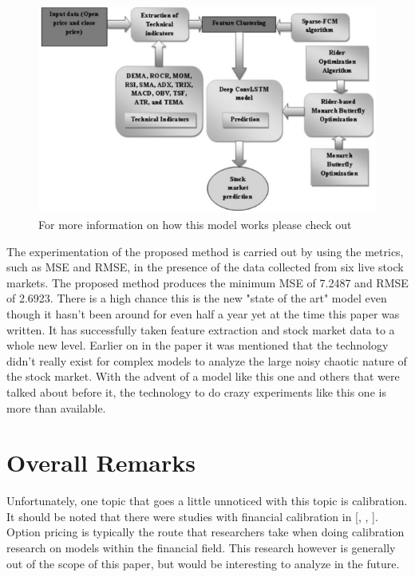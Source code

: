 \documentclass{article}
\theoremstyle{plain}
\theoremstyle{definition}
\numberwithin{equation}{section}
\numberwithin{theorem}{section}
\numberwithin{lemma}{section}
\numberwithin{definition}{section}
\numberwithin{proposition}{section}
\numberwithin{corollary}{section}
\begin{document}
	 \begin{figure}[h]
		\includegraphics[width=\linewidth]{butterfly}
		\caption{For more information on how this model works please check out \cite{Kelotra2020}}
	 \end{figure}
	 
	 
	 The experimentation of the proposed method is carried out by using the metrics, such as MSE and RMSE, in the presence of the data collected from six live stock markets. The proposed method produces the minimum MSE of 7.2487 and RMSE of 2.6923. There is a high chance this is the new "state of the art" model even though it hasn't been around for even half a year yet at the time this paper was written. It has successfully taken feature extraction and stock market data to a whole new level. Earlier on in the paper it was mentioned that the technology didn't really exist for complex models to analyze the large noisy chaotic nature of the stock market. With the advent of a model like this one and others that were talked about before it, the technology to do crazy experiments like this one is more than available.    
	 
	\section{Overall Remarks}
	Unfortunately, one topic that goes a little unnoticed with this topic is calibration. It should be noted that there were studies with financial calibration in [\cite{Itkin2019}, \cite{Culkin2017}, \cite{Hirsa2019}]. Option pricing is typically the route that researchers take when doing calibration research on models within the financial field. This research however is generally out of the scope of this paper, but would be interesting to analyze in the future.
\end{document}
